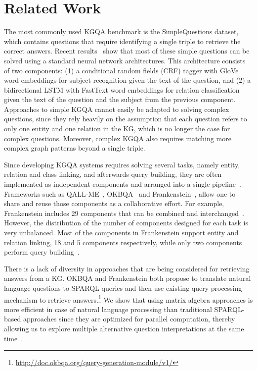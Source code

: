 \section{Related Work}
\label{sec:related_work}
The most commonly used KGQA benchmark is the SimpleQuestions \cite{DBLP:journals/corr/BordesUCW15} dataset, which contains questions that require identifying a single triple to retrieve the correct answers.
Recent results~\cite{DBLP:conf/emnlp/PetrochukZ18} show that most of these simple questions can be solved using a standard neural network architectures.
This architecture consists of two components: (1) a conditional random fields (CRF) tagger with GloVe word embeddings for subject recognition given the text of the question, and (2) a bidirectional LSTM with FastText word embeddings for relation classification given the text of the question and the subject from the previous component.
Approaches to simple KGQA cannot easily be adapted to solving complex questions, since they rely heavily on the assumption that each question refers to only one entity and one relation in the KG, which is no longer the case for complex questions.
Moreover, complex KGQA also requires matching more complex graph patterns beyond a single triple.

Since developing KGQA systems requires solving several tasks, namely entity, relation and class linking, and afterwards query building, they are often implemented as independent components and arranged into a single pipeline~\cite{DBLP:conf/semweb/DubeyBCL18}.
Frameworks such as QALL-ME~\cite{DBLP:journals/ws/FerrandezSKDFNITONMG11}, OKBQA~\cite{DBLP:conf/semweb/KimUNFHKCKUKC17} and Frankenstein~\cite{DBLP:conf/esws/SinghBRS18}, allow one to share and reuse those components as a collaborative effort.
For example, Frankenstein includes 29 components that can be combined and interchanged~\cite{DBLP:conf/www/SinghRBSLUVKP0V18}.
However, the distribution of the number of components designed for each task is very unbalanced.
Most of the components in Frankenstein support entity and relation linking, 18 and 5 components respectively, while only two components perform query building~\cite{DBLP:journals/corr/abs-1809-10044}.

There is a lack of diversity in approaches that are being considered for retrieving answers from a KG.
OKBQA and Frankenstein both propose to translate natural language questions to SPARQL queries and then use existing query processing mechanism to retrieve answers.\footnote{\url{http://doc.okbqa.org/query-generation-module/v1/}}
We show that using matrix algebra approaches is more efficient in case of natural language processing than traditional SPARQL-based approaches since they are optimized for parallel computation, thereby allowing us to explore multiple alternative question interpretations at the same time~\cite{DBLP:conf/hpec/KepnerABBFGHKLM16,jamour2018demonstration}.

